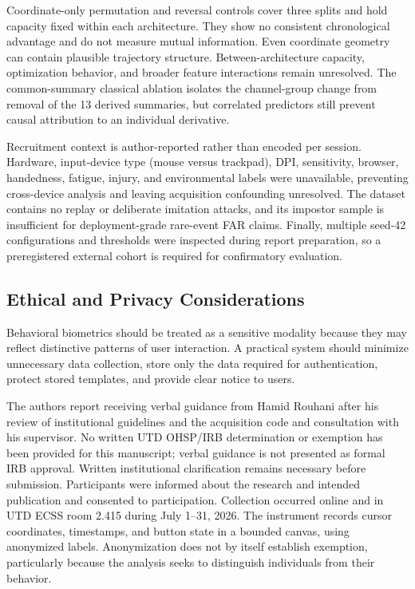 \documentclass[conference]{IEEEtran}
\begin{document}
Coordinate-only permutation and reversal controls cover three splits and hold
capacity fixed within each architecture. They show no consistent chronological
advantage and do not measure mutual information. Even coordinate geometry can
contain plausible trajectory structure. Between-architecture capacity,
optimization behavior, and broader feature interactions remain unresolved.
The common-summary classical ablation isolates the channel-group change from
removal of the 13 derived summaries, but correlated predictors still prevent
causal attribution to an individual derivative.

Recruitment context is author-reported rather than encoded per session.
Hardware, input-device type (mouse versus trackpad),
DPI, sensitivity, browser, handedness, fatigue, injury, and environmental
labels were unavailable, preventing cross-device analysis and leaving
acquisition confounding unresolved. The dataset contains no replay or deliberate
imitation attacks, and its impostor sample is insufficient for deployment-grade
rare-event FAR claims. Finally, multiple seed-42 configurations and thresholds
were inspected during report preparation, so a preregistered external cohort is
required for confirmatory evaluation.

\subsection{Ethical and Privacy Considerations}

Behavioral biometrics should be treated as a sensitive modality because they may reflect distinctive patterns of user interaction. A practical system should minimize unnecessary data collection, store only the data required for authentication, protect stored templates, and provide clear notice to users.

The authors report receiving verbal guidance from Hamid Rouhani after his
review of institutional guidelines and the acquisition code and consultation
with his supervisor. No written UTD OHSP/IRB determination or exemption has
been provided for this manuscript; verbal guidance is not presented as formal
IRB approval. Written institutional clarification remains necessary before
submission. Participants were informed about the research and intended
publication and consented to participation. Collection occurred online and in
UTD ECSS room 2.415 during July 1--31, 2026. The instrument records cursor
coordinates, timestamps, and button state in a bounded canvas, using anonymized
labels. Anonymization does not by itself establish exemption, particularly
because the analysis seeks to distinguish individuals from their behavior.
\end{document}
